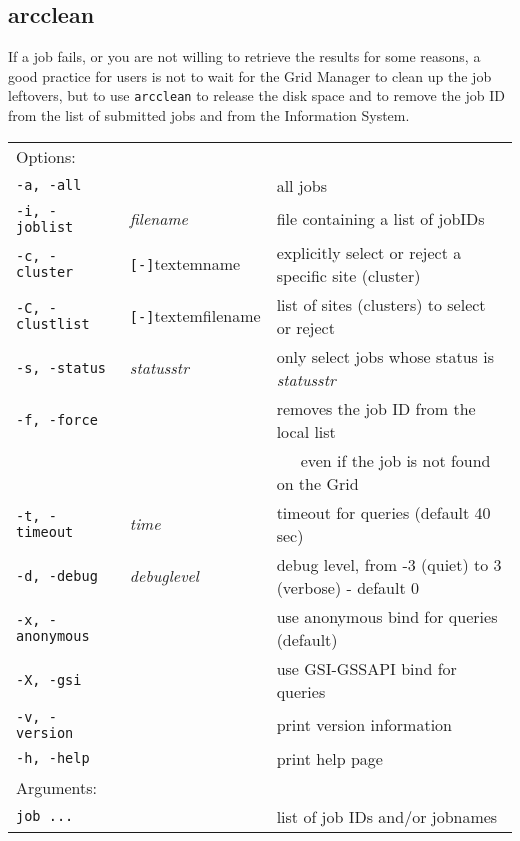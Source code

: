 \subsection{arcclean}
\label{sec:arcclean}

If a job fails, or you are not willing to retrieve the results for
some reasons, a good practice for users is not to wait for the Grid
Manager to clean up the job leftovers, but to use \texttt{arcclean}
 to release the disk space
and to remove the job ID from the list of submitted jobs and from
the Information System.

\hspace*{0.5cm}
\begin{shaded}
\end{shaded}
\begin{longtable}{llp{8cm}}
   Options:&&\\
   \texttt{-a, -all}& & all jobs\\
   \texttt{-i, -joblist}& \textit{filename} & file containing a list of jobIDs\\
   \texttt{-c, -cluster}&\verb#[-]#textem{name}&explicitly select or reject a specific site (cluster)\\
   \texttt{-C, -clustlist}&\verb#[-]#textem{filename}&list of sites (clusters) to select or reject\\
   \texttt{-s, -status}& \textit{statusstr} &only select jobs whose status is \textit{statusstr}\\
   \texttt{-f, -force} & & removes the job ID from the local list\\
   & &~~~even if the job is not found on the Grid\\
   \texttt{-t, -timeout}& \textit{time} & timeout for queries (default 40 sec)\\
   \texttt{-d, -debug}& \textit{debuglevel} &debug level, from -3 (quiet) to 3 (verbose) - default 0\\
   \texttt{-x, -anonymous}& & use anonymous bind for queries (default)\\
   \texttt{-X, -gsi}& & use GSI-GSSAPI bind for queries\\
   \texttt{-v, -version}& & print version information\\
   \texttt{-h, -help}& & print help page\\
   Arguments:&&\\
   \texttt{job ...} && list of job IDs and/or jobnames\\
\end{longtable}

